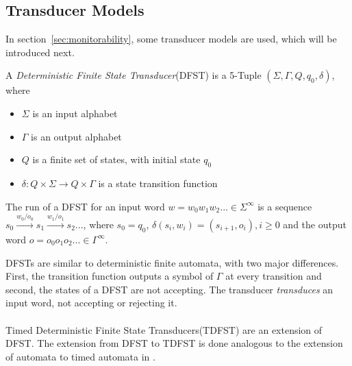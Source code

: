 	\subsection{Transducer Models}
		In section~\ref{sec:monitorability}, some transducer models are used, which will be introduced next.
		\begin{definition}
			A \textit{Deterministic Finite State Transducer}(DFST) is a 5-Tuple $(\Sigma, \Gamma, Q, q_0, \delta)$, where
			\begin{itemize}
				\item
				$\Sigma$ is an input alphabet
				\item
				$\Gamma$ is an output alphabet
				\item
				$Q$ is a finite set of states, with initial state $q_0$
				\item
				$\delta:Q\times\Sigma\rightarrow Q\times\Gamma$ is a state transition function 
			\end{itemize}
			The run of a DFST for an input word $w=w_0w_1w_2...\in\Sigma^\infty$ is a sequence $s_0\xrightarrow{w_0/o_0} s_1\xrightarrow{w_1/o_1} s_2...$, where $s_0=q_0$, $\delta(s_i,w_i)=(s_{i+1}, o_i), i \geq 0$ and the output word $o=o_0o_1o_2...\in\Gamma^\infty$.
		\end{definition}
		DFSTs are similar to deterministic finite automata, with two major differences. First, the transition function outputs a symbol of $\Gamma$ at every transition and second, the states of a DFST are not accepting. The transducer \textit{transduces} an input word, not accepting or rejecting it.\\ \\
		Timed Deterministic Finite State Transducers(TDFST) are an extension of DFST. The extension from DFST to TDFST is done analogous to the extension of automata to timed automata in \cite{ALUR1994183}.

